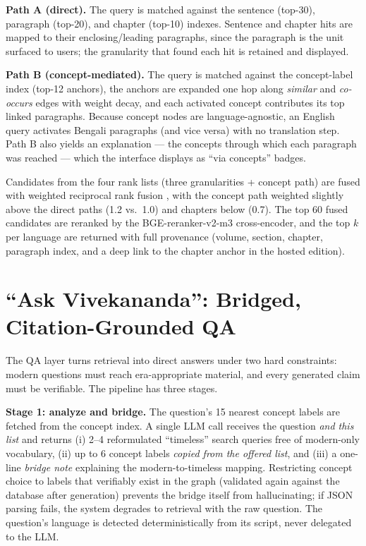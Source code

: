 \documentclass[11pt,a4paper]{article}
\begin{document}
\textbf{Path A (direct).} The query is matched against the sentence
(top-30), paragraph (top-20), and chapter (top-10) indexes. Sentence and
chapter hits are mapped to their enclosing/leading paragraphs, since the
paragraph is the unit surfaced to users; the granularity that found each
hit is retained and displayed.

\textbf{Path B (concept-mediated).} The query is matched against the
concept-label index (top-12 anchors), the anchors are expanded one hop
along \emph{similar} and \emph{co-occurs} edges with weight decay, and
each activated concept contributes its top linked paragraphs. Because
concept nodes are language-agnostic, an English query activates Bengali
paragraphs (and vice versa) with no translation step. Path B also yields
an explanation --- the concepts through which each paragraph was reached
--- which the interface displays as ``via concepts'' badges.

Candidates from the four rank lists (three granularities + concept path)
are fused with weighted reciprocal rank fusion \cite{cormack2009rrf},
with the concept path weighted slightly above the direct paths (1.2 vs.\
1.0) and chapters below (0.7). The top 60 fused candidates are reranked
by the BGE-reranker-v2-m3 cross-encoder, and the top $k$ per language are
returned with full provenance (volume, section, chapter, paragraph index,
and a deep link to the chapter anchor in the hosted edition).

\section{``Ask Vivekananda'': Bridged, Citation-Grounded QA}
\label{sec:qa}

The QA layer turns retrieval into direct answers under two hard
constraints: modern questions must reach era-appropriate material, and
every generated claim must be verifiable. The pipeline has three stages.

\textbf{Stage 1: analyze and bridge.} The question's 15 nearest concept
labels are fetched from the concept index. A single LLM call receives the
question \emph{and this list} and returns (i) 2--4 reformulated
``timeless'' search queries free of modern-only vocabulary, (ii) up to 6
concept labels \emph{copied from the offered list}, and (iii) a one-line
\emph{bridge note} explaining the modern-to-timeless mapping. Restricting
concept choice to labels that verifiably exist in the graph (validated
again against the database after generation) prevents the bridge itself
from hallucinating; if JSON parsing fails, the system degrades to
retrieval with the raw question. The question's language is detected
deterministically from its script, never delegated to the LLM.
\end{document}
